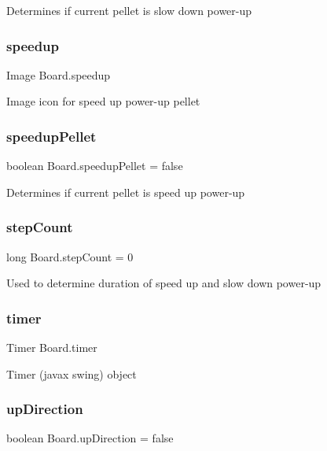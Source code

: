Determines if current pellet is slow down power-\/up \mbox{\label{class_board_a0c27edfc2944b6ebbc34e7f041ab3bec}} 
\subsubsection{\texorpdfstring{speedup}{speedup}}
{\footnotesize\ttfamily Image Board.\+speedup}

Image icon for speed up power-\/up pellet \mbox{\label{class_board_a57b230f404f9f86d8ed741d25e8dcfc3}} 
\subsubsection{\texorpdfstring{speedup\+Pellet}{speedupPellet}}
{\footnotesize\ttfamily boolean Board.\+speedup\+Pellet = false}

Determines if current pellet is speed up power-\/up \mbox{\label{class_board_a91e4464171d80a72609d5d2f25954d7b}} 
\subsubsection{\texorpdfstring{step\+Count}{stepCount}}
{\footnotesize\ttfamily long Board.\+step\+Count = 0}

Used to determine duration of speed up and slow down power-\/up \mbox{\label{class_board_adeea39bf09dfd689ac9396d7c6d95995}} 
\subsubsection{\texorpdfstring{timer}{timer}}
{\footnotesize\ttfamily Timer Board.\+timer}

Timer (javax swing) object \mbox{\label{class_board_a91c8cf23e650424074cb0cd1638541f8}} 
\subsubsection{\texorpdfstring{up\+Direction}{upDirection}}
{\footnotesize\ttfamily boolean Board.\+up\+Direction = false}

